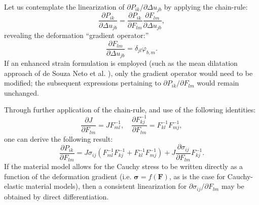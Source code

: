 	Let us contemplate the linearization of $\partial P_{ik} / \partial \Delta u_{jb}$ by applying the chain-rule:
	\begin{equation}
		\frac{\partial P_{ik}}{\partial \Delta u_{jb}} = \frac{\partial P_{ik}}{\partial F_{lm}} \frac{\partial F_{lm}}{\partial \Delta u_{jb}},
	\end{equation}
	revealing the deformation ``gradient operator:''
	\begin{equation}
		\frac{\partial F_{lm}}{\partial \Delta u_{jb}} = \delta_{jl} \varphi_{b,m}.
	\end{equation}
	If an enhanced strain formulation is employed (such as the mean dilatation approach of de Souza Neto et al. \cite{Souza:96}), only the gradient operator would need to be modified; the subsequent expressions pertaining to $\partial P_{ik} / \partial F_{lm}$ would remain unchanged.

	
	Through further application of the chain-rule, and use of the following identities:
	\begin{equation}
		\frac{\partial J}{\partial F_{lm}} = J F_{ml}^{-1}, \quad \frac{\partial F_{kj}^{-1}}{\partial F_{lm}} = F_{kl}^{-1} F_{mj}^{-1},
	\end{equation}
	one can derive the following result:
	\begin{equation}
		\frac{\partial P_{ik}}{\partial F_{lm}} = J \sigma_{ij} (F_{ml}^{-1} F_{kj}^{-1} + F_{kl}^{-1} F_{mj}^{-1})  + J \frac{\partial \sigma_{ij}}{\partial F_{lm}} F_{kj}^{-1}.
	\end{equation}
	If the material model allows for the Cauchy stress to be written directly as a function of the deformation gradient (i.e. $\boldsymbol{\sigma} = f(\bm{F})$, as is the case for Cauchy-elastic material models), then a consistent linearization for $\partial \sigma_{ij} / \partial F_{lm}$ may be obtained by direct differentiation.
	
